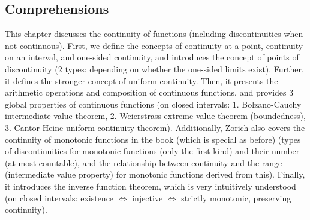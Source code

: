 \subsection{Comprehensions}
This chapter discusses the continuity of functions (including discontinuities when not continuous). First, we define the concepts of continuity at a point, continuity on an interval, and one-sided continuity, 
and introduces the concept of points of discontinuity ($2$ types: depending on whether the one-sided limits exist). Further, it defines the stronger concept of uniform continuity. Then, it presents the arithmetic 
operations and composition of continuous functions, and provides $3$ global properties of continuous functions (on closed intervals: 1. Bolzano-Cauchy intermediate value theorem, 2. Weierstrass extreme value theorem 
(boundedness), 3. Cantor-Heine uniform continuity theorem). Additionally, Zorich also covers the continuity of monotonic functions in the book (which is special as before) (types of discontinuities for monotonic 
functions (only the first kind) and their number (at most countable), and the relationship between continuity and the range (intermediate value property) for monotonic functions derived from this). Finally, it 
introduces the inverse function theorem, which is very intuitively understood (on closed intervals: existence $\Leftrightarrow$ injective $\Leftrightarrow$ strictly monotonic, preserving continuity).
\newline\newline
